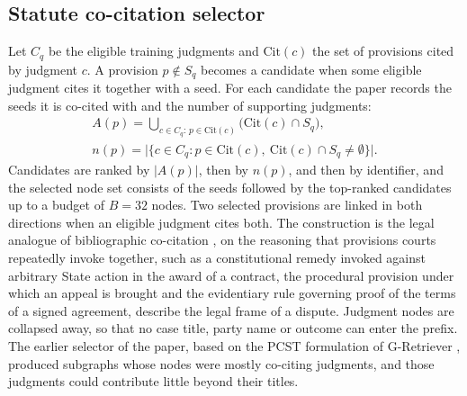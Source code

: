 \documentclass[journal]{IEEEtran}
\begin{document}
\subsection{Statute co-citation selector}
Let $C_q$ be the eligible training judgments and $\mathrm{Cit}(c)$ the set of provisions cited by judgment $c$. A provision $p\notin S_q$ becomes a candidate when some eligible judgment cites it together with a seed. For each candidate the paper records the seeds it is co-cited with and the number of supporting judgments:
\begin{equation}
\begin{gathered}A(p)=\bigcup_{c\in C_q:\,p\in\mathrm{Cit}(c)}\bigl(\mathrm{Cit}(c)\cap S_q\bigr),\\
n(p)=\bigl|\{c\in C_q:p\in\mathrm{Cit}(c),\ \mathrm{Cit}(c)\cap S_q\neq\emptyset\}\bigr|.\end{gathered}
\end{equation}
Candidates are ranked by $|A(p)|$, then by $n(p)$, and then by identifier, and the selected node set consists of the seeds followed by the top-ranked candidates up to a budget of $B=32$ nodes. Two selected provisions are linked in both directions when an eligible judgment cites both. The construction is the legal analogue of bibliographic co-citation \cite{r31}, on the reasoning that provisions courts repeatedly invoke together, such as a constitutional remedy invoked against arbitrary State action in the award of a contract, the procedural provision under which an appeal is brought and the evidentiary rule governing proof of the terms of a signed agreement, describe the legal frame of a dispute. Judgment nodes are collapsed away, so that no case title, party name or outcome can enter the prefix. The earlier selector of the paper, based on the PCST formulation of G-Retriever \cite{r23,r55}, produced subgraphs whose nodes were mostly co-citing judgments, and those judgments could contribute little beyond their titles.
\end{document}
